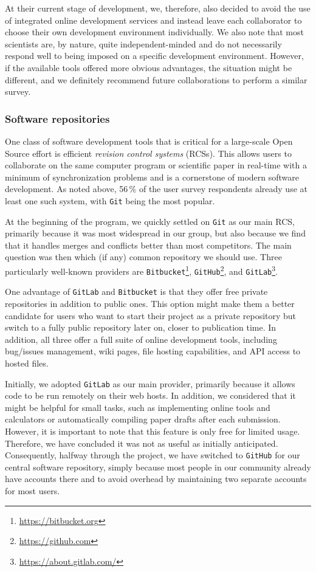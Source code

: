 \documentclass[twocolumn]{aa}
\begin{document}
At their current stage of development, we, therefore, also decided to avoid the use of integrated online development services and instead leave each collaborator to choose their own development environment individually. We also note that most scientists are, by nature, quite independent-minded and do not necessarily respond well to being imposed on a specific development environment. However, if the available tools offered more obvious advantages, the situation might be different, and we definitely recommend future collaborations to perform a similar survey.


\subsubsection{Software repositories}

One class of software development tools that is critical for a large-scale Open Source effort is efficient \textit{revision control systems} (RCSs). This allows users to collaborate on the same computer program or scientific paper in real-time with a minimum of synchronization problems and is a cornerstone of modern software development. As noted above, 56\,\% of the user survey respondents already use at least one such system, with \texttt{Git} being the most popular.

At the beginning of the program, we quickly settled on \texttt{Git} as our main RCS, primarily because it was most widespread in our group, but also because we find that it handles merges and conflicts better than most competitors. The main question was then which (if any) common repository we should use. Three particularly well-known providers are \texttt{Bitbucket}\footnote{\url{https://bitbucket.org}}, \texttt{GitHub}\footnote{\url{https://github.com}}, and \texttt{GitLab}\footnote{\url{https://about.gitlab.com/}}.

One advantage of \texttt{GitLab} and \texttt{Bitbucket} is that they offer free private repositories in addition to public ones. This option might make them a better candidate for users who want to start their project as a private repository but switch to a fully public repository later on, closer to publication time. In addition, all three offer a full suite of online development tools, including bug/issues management, wiki pages, file hosting capabilities, and API access to hosted files.

Initially, we adopted \texttt{GitLab} as our main provider, primarily because it allows code to be run remotely on their web hosts. In addition, we considered that it might be helpful for small tasks, such as implementing online tools and calculators or automatically compiling paper drafts after each submission. However, it is important to note that this feature is only free for limited usage. Therefore, we have concluded it was not as useful as initially anticipated. Consequently, halfway through the project, we have switched to \texttt{GitHub} for our central software repository, simply because most people in our community already have accounts there and to avoid overhead by maintaining two separate accounts for most users.
\end{document}
